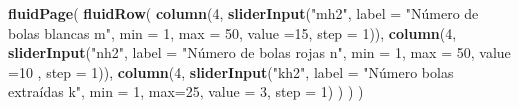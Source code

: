 \documentclass[]{book}
\newenvironment{Shaded}{\begin{snugshade}}{\end{snugshade}}
\newcommand{\DataTypeTok}[1]{\textcolor[rgb]{0.13,0.29,0.53}{#1}}
\newcommand{\DecValTok}[1]{\textcolor[rgb]{0.00,0.00,0.81}{#1}}
\newcommand{\KeywordTok}[1]{\textcolor[rgb]{0.13,0.29,0.53}{\textbf{#1}}}
\newcommand{\NormalTok}[1]{#1}
\newcommand{\StringTok}[1]{\textcolor[rgb]{0.31,0.60,0.02}{#1}}
\begin{document}
\begin{Shaded}
\begin{Highlighting}[]
\KeywordTok{fluidPage}\NormalTok{(}
\KeywordTok{fluidRow}\NormalTok{(}
  \KeywordTok{column}\NormalTok{(}\DecValTok{4}\NormalTok{,}
         \KeywordTok{sliderInput}\NormalTok{(}\StringTok{"mh2"}\NormalTok{, }\DataTypeTok{label =} \StringTok{"Número de bolas blancas m"}\NormalTok{,}
              \DataTypeTok{min =} \DecValTok{1}\NormalTok{, }\DataTypeTok{max =} \DecValTok{50}\NormalTok{, }\DataTypeTok{value =}\DecValTok{15}\NormalTok{, }\DataTypeTok{step =} \DecValTok{1}\NormalTok{)),}
  \KeywordTok{column}\NormalTok{(}\DecValTok{4}\NormalTok{,}
         \KeywordTok{sliderInput}\NormalTok{(}\StringTok{"nh2"}\NormalTok{, }\DataTypeTok{label =} \StringTok{"Número de bolas rojas n"}\NormalTok{,}
              \DataTypeTok{min =} \DecValTok{1}\NormalTok{, }\DataTypeTok{max =} \DecValTok{50}\NormalTok{, }\DataTypeTok{value =}\DecValTok{10}\NormalTok{ , }\DataTypeTok{step =} \DecValTok{1}\NormalTok{)),}
  \KeywordTok{column}\NormalTok{(}\DecValTok{4}\NormalTok{,}
          \KeywordTok{sliderInput}\NormalTok{(}\StringTok{"kh2"}\NormalTok{, }\DataTypeTok{label =} \StringTok{"Número bolas extraídas k"}\NormalTok{,}
                     \DataTypeTok{min =} \DecValTok{1}\NormalTok{, }\DataTypeTok{max=}\DecValTok{25}\NormalTok{, }\DataTypeTok{value =} \DecValTok{3}\NormalTok{, }\DataTypeTok{step =} \DecValTok{1}\NormalTok{)}
\NormalTok{         )}
\NormalTok{  )}
\NormalTok{)}


\end{Highlighting}
\end{Shaded}
\end{document}
